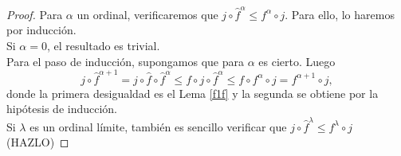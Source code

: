 \begin{proof}
    Para $\alpha$ un ordinal, verificaremos que $j\circ \hat{f}^\alpha\leq f^\alpha\circ j$. Para ello, lo haremos por inducción.\\

    Si $\alpha=0$, el resultado es trivial.\\

    Para el paso de inducción, supongamos que para $\alpha$ es cierto. Luego
    \[
    j\circ \hat{f}^{\alpha+1}=j\circ \hat{f}\circ \hat{f}^{\alpha}\leq  f\circ j\circ \hat{f}^\alpha\leq f\circ f^\alpha\circ j=f^{\alpha+1}\circ j,
    \]
    donde la primera desigualdad es el Lema \ref{f1f} y la segunda se obtiene por la hipótesis de inducción.\\

    Si $\lambda$ es un ordinal límite, también es sencillo verificar que $j\circ \hat{f}^\lambda\leq f^\lambda\circ j$ (HAZLO)
\end{proof}